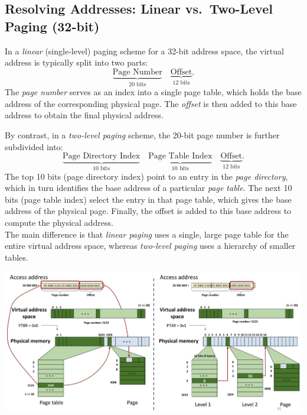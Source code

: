 \documentclass[../../compsys.tex]{subfiles}
\begin{document}
\subsection{Resolving Addresses: Linear vs.\ Two-Level Paging (32-bit)}
\noindent
\begin{minipage}{0.42\textwidth}
\footnotesize
In a \emph{linear} (single-level) paging scheme for a 32-bit address space, the virtual address is typically split into two parts: 
\[
\underbrace{\text{Page Number}}_{20 \text{ bits}} \quad \underbrace{\text{Offset}}_{12 \text{ bits}}.
\]
The \emph{page number} serves as an index into a single page table, which holds the base address of the corresponding physical page. The \emph{offset} is then added to this base address to obtain the final physical address.

By contrast, in a \emph{two-level paging} scheme, the 20-bit page number is further subdivided into:
\[
\underbrace{\text{Page Directory Index}}_{10 \text{ bits}} 
\quad
\underbrace{\text{Page Table Index}}_{10 \text{ bits}}
\quad
\underbrace{\text{Offset}}_{12 \text{ bits}}.
\]
The top 10 bits (page directory index) point to an entry in the \emph{page directory}, which in turn identifies the base address of a particular \emph{page table}. The next 10 bits (page table index) select the entry in that page table, which gives the base address of the physical page. Finally, the offset is added to this base address to compute the physical address.\\[5px]
The main difference is that \emph{linear paging} uses a single, large page table for the entire virtual address space, whereas \emph{two-level paging} uses a hierarchy of smaller tables. 
\end{minipage}%
\hfill
\vline
\hfill
\begin{minipage}{0.55\textwidth}
  \begin{center}
    \includegraphics[width=1.2\textwidth]{chapters/L5/images/vs.png}
  \end{center}
\end{minipage}\\
\end{document}
